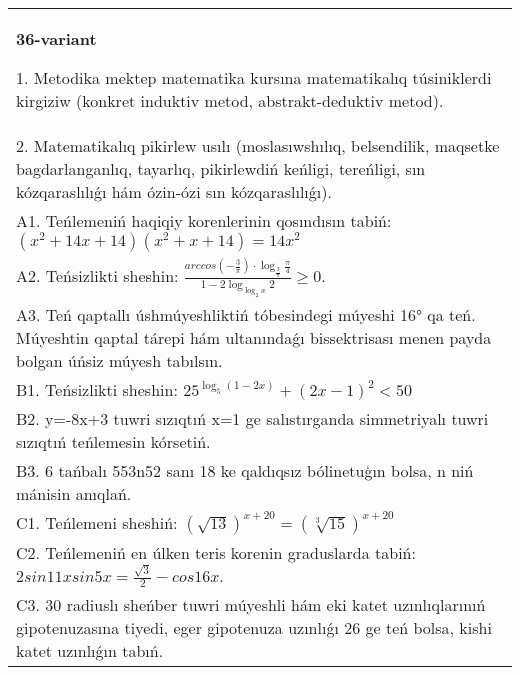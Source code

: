 \documentclass{article}
\begin{document}
\begin{tabular}{m{17cm}}
\textbf{36-variant}

1. Metodika mektep matematika kursına matematikalıq túsiniklerdi kirgiziw (konkret induktiv metod, abstrakt-deduktiv metod). \\
2. Matematikalıq pikirlew usılı (moslasıwshılıq, belsendilik, maqsetke bagdarlanganlıq, tayarlıq, pikirlewdiń keńligi, tereńligi, sın kózqaraslılıǵı hám ózin-ózi sın kózqaraslılıǵı). \\
A1. Teńlemeniń haqiqiy korenlerinin qosındısın tabiń: \((x^2 + 14x + 14) (x^2 + x + 14) = 14x^2\) \\
A2. Teńsizlikti sheshin: \(\frac{arccos (- \frac{3}{\pi}) \cdot \log_{\frac{3}{\pi}}\frac{\pi}{4}}{1 - 2\log_{\log_{2}x}2} \geq 0\). \\
A3. Teń qaptallı úshmúyeshliktiń tóbesindegi múyeshi 16° qa teń. Múyeshtin qaptal tárepi hám ultanındaǵı bissektrisası menen payda bolgan úńsiz múyesh tabılsın. \\
B1. Teńsizlikti sheshin: \(25^{\log_{5}{ (1 - 2x) }} + { (2x - 1) }^{2} < 50\) \\
B2. y=-8x+3 tuwri sızıqtıń x=1 ge salıstırganda simmetriyalı tuwri sızıqtıń teńlemesin kórsetiń. \\
B3. 6 tańbalı 553n52 sanı 18 ke qaldıqsız bólinetuģın bolsa, n niń mánisin anıqlań. \\
C1. Teńlemeni sheshiń: \((\sqrt{13}) ^{x + 20} = (\sqrt[3]{15}) ^{x + 20}\) \\
C2. Teńlemeniń en úlken teris korenin graduslarda tabiń: \(2sin11xsin5x = \frac{\sqrt{3}}{2} - cos16x\). \\
C3. 30 radiuslı sheńber tuwri múyeshli hám eki katet uzınlıqlarınıń gipotenuzasına tiyedi, eger gipotenuza uzınlıǵı 26 ge teń bolsa, kishi katet uzınlıǵın tabıń. \\

\end{tabular}
\vspace{1cm}
\end{document}
